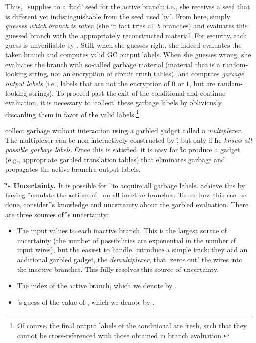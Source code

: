 Thus, \HK\ supplies to \E a `bad' seed for the active branch: i.e.,
she receives a seed that is different yet indistinguishable from the
seed used by \G.
From here, \E
simply \emph{guesses which branch is taken} (she in fact tries  all $b$
branches) and evaluates this guessed branch with the appropriately reconstructed material.
For security, each guess is unverifiable by \E. 
Still, when she guesses right, she indeed evaluates the taken branch and
computes valid GC output labels.
When she guesses wrong, she evaluates the branch
with so-called garbage material (material that is a random-looking string, not
an encryption of circuit truth tables), and computes
\emph{garbage output labels} (i.e., labels that are not the encryption
of $0$ or $1$, but are random-looking strings).
%
To proceed past the exit of the conditional and continue evaluation, it is necessary to
`collect'  these garbage labels by obliviously  discarding them in favor of the valid
labels.\footnote{Of course, the final output labels of the conditional
  are fresh,  such that they cannot be cross-referenced with those
obtained in branch evaluation.}


\HK collect garbage without
interaction using a garbled gadget called a \emph{multiplexer}.
%
The multiplexer can be non-interactively constructed by \G,
but only if he \emph{knows all possible garbage labels}.
Once this is satisfied, it is easy for \G to produce a gadget
(e.g., appropriate garbled translation tables)
that eliminates garbage and propagates the active branch's output
labels.


{\bf \G's Uncertainty.}
It is possible for \G\ to acquire all garbage labels.
\HK achieve this by having \G\ emulate the actions of \E\
 on all inactive branches.
To see how this can be done,
 consider \G's knowledge and uncertainty about the garbled evaluation.
 There are three sources of \G's uncertainty:
\begin{itemize}
  \item The input values to each inactive branch.
    This is the largest source of uncertainty (the number of
    possibilities are exponential in the number of input wires), but
    the easiest to handle.  \HK introduce a simple trick:
    they add an additional garbled gadget, the \emph{demultiplexer},
    that `zeros out' the wires into the inactive branches.
    This fully resolves this source of uncertainty.
  \item The index of the active branch, which we denote by \truth.
  \item \E's guess of the value of \truth, which we denote by \guess.
\end{itemize}

